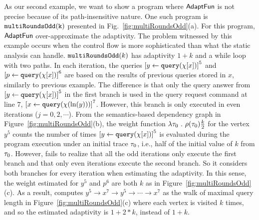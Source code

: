 As our second example, we want to show a program where $\textsf{AdaptFun}$ is not precise because of its path-insensitive nature. 
    One such program is $\mathtt{multiRoundsOdd(k)}$ presented in Fig.~\ref{fig:multiRoundsOdd}(a). For this program, $\textsf{AdaptFun}$ over-approximate the adaptivity.
The problem witnessed by this example occurs when the control flow is more sophisticated than what the static analysis can handle. 
$\mathtt{multiRoundsOdd}(k)$
has adaptivity $1 + k$ and a  while loop with two paths.
In each iteration, the queries $\clabel{\assign{y}{\query(\chi[x])}}^{5}$
and $\clabel{\assign{p}{\query(\chi[x])}}^{6}$ are based on the results of previous queries stored in $x$,
similarly to previous example.
The difference is that only the query answer from $\clabel{\assign{y}{\query(\chi[x])}}^{5}$ in the first branch
is used in the query request command at line $7$, $\clabel{\assign{x}{\query(\chi(\ln(y)))} }^{7}$.
However, this branch is only executed in even iterations ($j = 0, 2, \cdots $).
From the semantics-based dependency graph in Figure~\ref{fig:multiRoundsOdd}(b),
the weight function $\lambda \mathtt{\tau}_0 ~.~ \rho(\mathtt{\tau}_0) \frac{k}{2}$ for the vertex $y^5$ counts the
number of times $\clabel{\assign{y}{\query(\chi[x])}}^{5}$ is evaluated during the program execution under an initial trace $\mathtt{\tau}_0$, i.e., half of the initial value of $k$ from $\mathtt{\tau}_0$.
However, {\THESYSTEM} fails to realize that all the odd iterations only execute the first branch
and that only even iterations execute the second branch. 
So it considers both branches for every iteration when estimating the adaptivity. 
In this sense, the weight estimated for $y^5$ and $p^6$ are both 
$k$ as in Figure~\ref{fig:multiRoundsOdd}(c).
As a result, {\THESYSTEM} computes $y^5  \to x^7  \to y^5  \to \cdots \to x^7 $
as the walk of maximal query length in Figure~\ref{fig:multiRoundsOdd}(c)
where each vertex is visited $k$ times, and so the estimated adaptivity is $1 + 2 * k$, instead of $1 + k$. 
%

